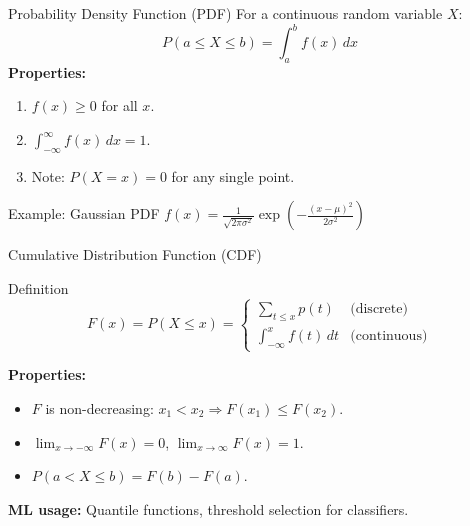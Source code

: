 \begin{frame}{Probability Density Function (PDF)}
For a continuous random variable $X$:
\[
P(a \leq X \leq b) = \int_a^b f(x)\, dx
\]
\textbf{Properties:}
\begin{enumerate}
    \item $f(x) \geq 0$ for all $x$.
    \item $\displaystyle\int_{-\infty}^{\infty} f(x)\, dx = 1$.
    \item Note: $P(X = x) = 0$ for any single point.
\end{enumerate}
\begin{exampleblock}{Example: Gaussian PDF}
$f(x) = \frac{1}{\sqrt{2\pi\sigma^2}}\exp\!\left(-\frac{(x-\mu)^2}{2\sigma^2}\right)$
\end{exampleblock}
\end{frame}

\begin{frame}{Cumulative Distribution Function (CDF)}
\begin{block}{Definition}
\[
F(x) = P(X \leq x) = \begin{cases}
\displaystyle\sum_{t \leq x} p(t) & \text{(discrete)}\\[8pt]
\displaystyle\int_{-\infty}^{x} f(t)\, dt & \text{(continuous)}
\end{cases}
\]
\end{block}
\textbf{Properties:}
\begin{itemize}
    \item $F$ is non-decreasing: $x_1 < x_2 \Rightarrow F(x_1) \leq F(x_2)$.
    \item $\lim_{x\to-\infty} F(x) = 0$, \quad $\lim_{x\to\infty} F(x) = 1$.
    \item $P(a < X \leq b) = F(b) - F(a)$.
\end{itemize}
\textbf{ML usage:} Quantile functions, threshold selection for classifiers.
\end{frame}

